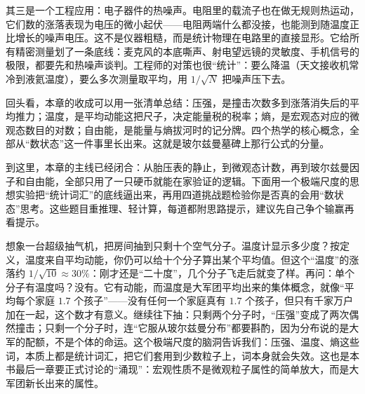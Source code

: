 其三是一个工程应用：电子器件的热噪声。电阻里的载流子也在做无规则热运动，它们数的涨落表现为电压的微小起伏——电阻两端什么都没接，也能测到随温度正比增长的噪声电压。这不是仪器粗糙，而是统计物理在电路里的直接显形。它给所有精密测量划了一条底线：麦克风的本底嘶声、射电望远镜的灵敏度、手机信号的极限，都要先和热噪声谈判。工程师的对策也很“统计”：要么降温（天文接收机常冷到液氦温度），要么多次测量取平均，用 \(1/\sqrt{N}\) 把噪声压下去。

回头看，本章的收成可以用一张清单总结：压强，是撞击次数多到涨落消失后的平均推力；温度，是平均动能这把尺子，决定能量税的税率；熵，是宏观态对应的微观态数目的对数；自由能，是能量与熵拔河时的记分牌。四个热学的核心概念，全部从“数状态”这一件事里长出来。这就是玻尔兹曼墓碑上那行公式的分量。


到这里，本章的主线已经闭合：从胎压表的静止，到微观态计数，再到玻尔兹曼因子和自由能，全部只用了一只硬币就能在家验证的逻辑。下面用一个极端尺度的思想实验把“统计词汇”的底线逼出来，再用四道挑战题检验你是否真的会用“数状态”思考。这些题目重推理、轻计算，每道都附思路提示，建议先自己争个输赢再看提示。

\begin{thought}[只剩十个分子的房间]
想象一台超级抽气机，把房间抽到只剩十个空气分子。温度计显示多少度？按定义，温度来自平均动能，你仍可以给十个分子算出某个平均值。但这个“温度”的涨落约 \(1/\sqrt{10}\approx30\%\)：刚才还是“二十度”，几个分子飞走后就变了样。再问：单个分子有温度吗？没有。它有动能，而温度是大军团平均出来的集体概念，就像“平均每个家庭 \(1.7\) 个孩子”——没有任何一个家庭真有 \(1.7\) 个孩子，但只有千家万户加在一起，这个数才有意义。继续往下抽：只剩两个分子时，“压强”变成了两次偶然撞击；只剩一个分子时，连“它服从玻尔兹曼分布”都要斟酌，因为分布说的是大军的配额，不是个体的命运。这个极端尺度的脑洞告诉我们：压强、温度、熵这些词，本质上都是统计词汇，把它们套用到少数粒子上，词本身就会失效。这也是本书最后一章要正式讨论的“涌现”：宏观性质不是微观粒子属性的简单放大，而是大军团新长出来的属性。
\end{thought}

